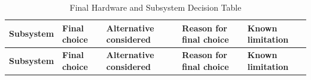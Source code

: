 \FloatBarrier
{\scriptsize
\setlength{\tabcolsep}{3pt}
\renewcommand{\arraystretch}{1.1}
\begin{longtable}{|p{}|p{}|p{}|p{}|p{}|}
\caption{Final Hardware and Subsystem Decision Table}
\label{tab:final_hardware_subsystem_decisions} \\
\hline
\textbf{Subsystem} & \textbf{Final choice} & \textbf{Alternative considered} & \textbf{Reason for final choice} & \textbf{Known limitation} \\
\hline
\endfirsthead

\hline
\textbf{Subsystem} & \textbf{Final choice} & \textbf{Alternative considered} & \textbf{Reason for final choice} & \textbf{Known limitation} \\
\hline
\endhead


\end{longtable}}
